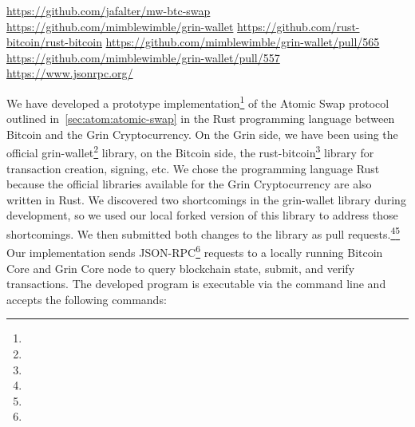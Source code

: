 \urldef\urlgithub\url{https://github.com/jafalter/mw-btc-swap}
\urldef\urlgrinwallet\url{https://github.com/mimblewimble/grin-wallet}
\urldef\urlrustbitcoin\url{https://github.com/rust-bitcoin/rust-bitcoin}
\urldef\urlprone\url{https://github.com/mimblewimble/grin-wallet/pull/565}
\urldef\urlprtwo\url{https://github.com/mimblewimble/grin-wallet/pull/557}
\urldef\urljsonrpc\url{https://www.jsonrpc.org/}

We have developed a prototype implementation\footnote{\urlgithub} of the Atomic Swap protocol outlined in~\cref{sec:atom:atomic-swap} in the Rust programming language between Bitcoin and the Grin Cryptocurrency.
On the Grin side, we have been using the official grin-wallet\footnote{\urlgrinwallet} library, on the Bitcoin side, the rust-bitcoin\footnote{\urlrustbitcoin} library for transaction creation, signing, etc.
We chose the programming language Rust because the official libraries available for the Grin Cryptocurrency are also written in Rust.
We discovered two shortcomings in the grin-wallet library during development, so we used our local forked version of this library to address those shortcomings.
We then submitted both changes to the library as pull requests.\footnote{\urlprone}\footnote{\urlprtwo}
Our implementation sends JSON-RPC\footnote{\urljsonrpc} requests to a locally running Bitcoin Core and Grin Core node to query blockchain state, submit, and verify transactions.
The developed program is executable via the command line and accepts the following commands:
